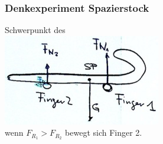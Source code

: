 \subsubsection{Denkexperiment Spazierstock}
Schwerpunkt des \\
\includegraphics{Bild39} \\
wenn $F_{R_1} > F_{R_2}$ bewegt sich Finger 2.
